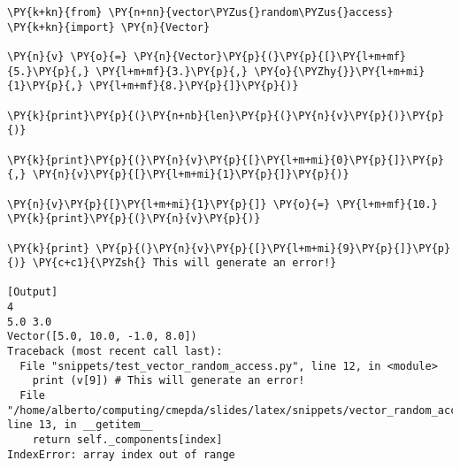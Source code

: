 \begin{Verbatim}[label=\makebox{\url{https://bitbucket.org/lbaldini/programming/src/tip/snippets/test\_vector\_random\_access.py}},commandchars=\\\{\}]
\PY{k+kn}{from} \PY{n+nn}{vector\PYZus{}random\PYZus{}access} \PY{k+kn}{import} \PY{n}{Vector}

\PY{n}{v} \PY{o}{=} \PY{n}{Vector}\PY{p}{(}\PY{p}{[}\PY{l+m+mf}{5.}\PY{p}{,} \PY{l+m+mf}{3.}\PY{p}{,} \PY{o}{\PYZhy{}}\PY{l+m+mi}{1}\PY{p}{,} \PY{l+m+mf}{8.}\PY{p}{]}\PY{p}{)}

\PY{k}{print}\PY{p}{(}\PY{n+nb}{len}\PY{p}{(}\PY{n}{v}\PY{p}{)}\PY{p}{)}

\PY{k}{print}\PY{p}{(}\PY{n}{v}\PY{p}{[}\PY{l+m+mi}{0}\PY{p}{]}\PY{p}{,} \PY{n}{v}\PY{p}{[}\PY{l+m+mi}{1}\PY{p}{]}\PY{p}{)}

\PY{n}{v}\PY{p}{[}\PY{l+m+mi}{1}\PY{p}{]} \PY{o}{=} \PY{l+m+mf}{10.}
\PY{k}{print}\PY{p}{(}\PY{n}{v}\PY{p}{)}

\PY{k}{print} \PY{p}{(}\PY{n}{v}\PY{p}{[}\PY{l+m+mi}{9}\PY{p}{]}\PY{p}{)} \PY{c+c1}{\PYZsh{} This will generate an error!}

[Output]
4
5.0 3.0
Vector([5.0, 10.0, -1.0, 8.0])
Traceback (most recent call last):
  File "snippets/test_vector_random_access.py", line 12, in <module>
    print (v[9]) # This will generate an error!
  File "/home/alberto/computing/cmepda/slides/latex/snippets/vector_random_access.py", line 13, in __getitem__
    return self._components[index]
IndexError: array index out of range
\end{Verbatim}